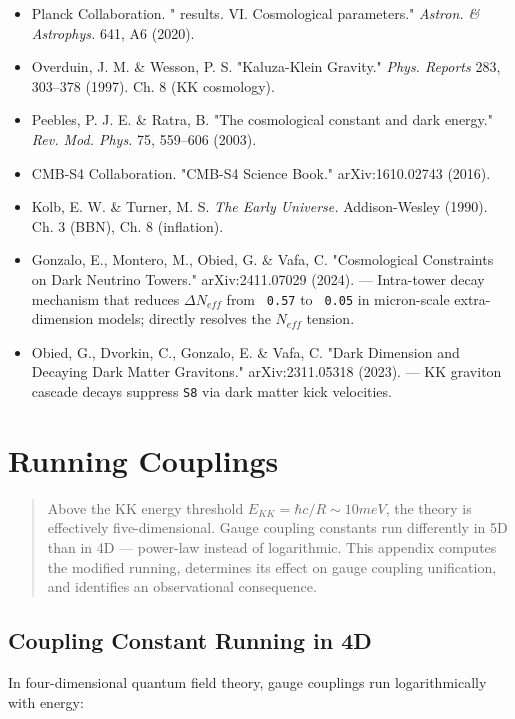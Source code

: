 \documentclass[aps,prd,preprint,superscriptaddress,longbibliography,floatfix]{revtex4-2}
\theoremstyle{remark}
\begin{document}
\begin{itemize}
  \item Planck Collaboration. "\cite{Planck2018_VI} results. VI. Cosmological parameters." \textit{Astron. \& Astrophys.} 641, A6 (2020).
  \item Overduin, J. M. \& Wesson, P. S. "Kaluza-Klein Gravity." \textit{Phys. Reports} 283, 303--378 (1997). Ch. 8 (KK cosmology).
  \item Peebles, P. J. E. \& Ratra, B. "The cosmological constant and dark energy." \textit{Rev. Mod. Phys.} 75, 559--606 (2003).
  \item CMB-S4 Collaboration. "CMB-S4 Science Book." arXiv:1610.02743 (2016).
  \item Kolb, E. W. \& Turner, M. S. \textit{The Early Universe.} Addison-Wesley (1990). Ch. 3 (BBN), Ch. 8 (inflation).
  \item Gonzalo, E., Montero, M., Obied, G. \& Vafa, C. "Cosmological Constraints on Dark Neutrino Towers." arXiv:2411.07029 (2024). --- Intra-tower decay mechanism that reduces $\Delta N_{eff}$ from \texttt{~0.57} to \texttt{~0.05} in micron-scale extra-dimension models; directly resolves the $N_{eff}$ tension.
  \item Obied, G., Dvorkin, C., Gonzalo, E. \& Vafa, C. "Dark Dimension and Decaying Dark Matter Gravitons." arXiv:2311.05318 (2023). --- KK graviton cascade decays suppress \texttt{S8} via dark matter kick velocities.
\end{itemize}


\section{Running Couplings}


\begin{quote}
Above the KK energy threshold $E_{KK} = \hbar c/R \sim  10 meV$, the theory is
effectively five-dimensional. Gauge coupling constants run differently in
5D than in 4D --- power-law instead of logarithmic. This appendix computes
the modified running, determines its effect on gauge coupling unification,
and identifies an observational consequence.
\end{quote}



\subsection{Coupling Constant Running in 4D}

In four-dimensional quantum field theory, gauge couplings run logarithmically with energy:
\end{document}
